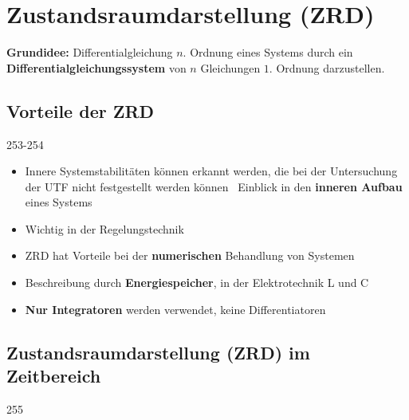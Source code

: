 \section{Zustandsraumdarstellung (ZRD)}

\textbf{Grundidee:} Differentialgleichung $n.$ Ordnung eines Systems durch ein \textbf{Differentialgleichungssystem} 
von $n$ Gleichungen $1.$ Ordnung darzustellen.


\subsection{Vorteile der ZRD}{253-254}
\begin{itemize}
    \item Innere Systemstabilitäten können erkannt werden, die bei der Untersuchung der UTF 
        nicht festgestellt werden können \textrightarrow\ Einblick in den \textbf{inneren Aufbau} eines Systems
    \item Wichtig in der Regelungstechnik
    \item ZRD hat Vorteile bei der \textbf{numerischen} Behandlung von Systemen
    \item Beschreibung durch \textbf{Energiespeicher}, in der Elektrotechnik L und C
    \item \textbf{Nur Integratoren} werden verwendet, keine Differentiatoren
\end{itemize}


\subsection{Zustandsraumdarstellung (ZRD) im Zeitbereich}{255}
\label{ZRD Zeitbereich}

